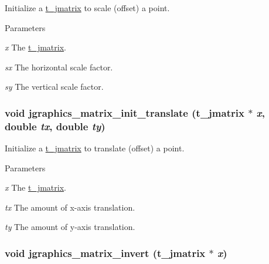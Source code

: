 Initialize a \hyperlink{structt__jmatrix}{t\_\-jmatrix} to scale (offset) a point. 
\begin{DoxyParams}{Parameters}
\item[{\em x}]The \hyperlink{structt__jmatrix}{t\_\-jmatrix}. \item[{\em sx}]The horizontal scale factor. \item[{\em sy}]The vertical scale factor. \end{DoxyParams}
\hypertarget{group__jmatrix_gad5a50cfd545eaec3cf4adb02bb4f4995}{
\subsubsection[{jgraphics\_\-matrix\_\-init\_\-translate}]{\setlength{\rightskip}{0pt plus 5cm}void jgraphics\_\-matrix\_\-init\_\-translate ({\bf t\_\-jmatrix} $\ast$ {\em x}, \/  double {\em tx}, \/  double {\em ty})}}
\label{group__jmatrix_gad5a50cfd545eaec3cf4adb02bb4f4995}


Initialize a \hyperlink{structt__jmatrix}{t\_\-jmatrix} to translate (offset) a point. 
\begin{DoxyParams}{Parameters}
\item[{\em x}]The \hyperlink{structt__jmatrix}{t\_\-jmatrix}. \item[{\em tx}]The amount of x-\/axis translation. \item[{\em ty}]The amount of y-\/axis translation. \end{DoxyParams}
\hypertarget{group__jmatrix_gae46840f2ac22aee22c9b211d60f4b381}{
\subsubsection[{jgraphics\_\-matrix\_\-invert}]{\setlength{\rightskip}{0pt plus 5cm}void jgraphics\_\-matrix\_\-invert ({\bf t\_\-jmatrix} $\ast$ {\em x})}}
\label{group__jmatrix_gae46840f2ac22aee22c9b211d60f4b381}


